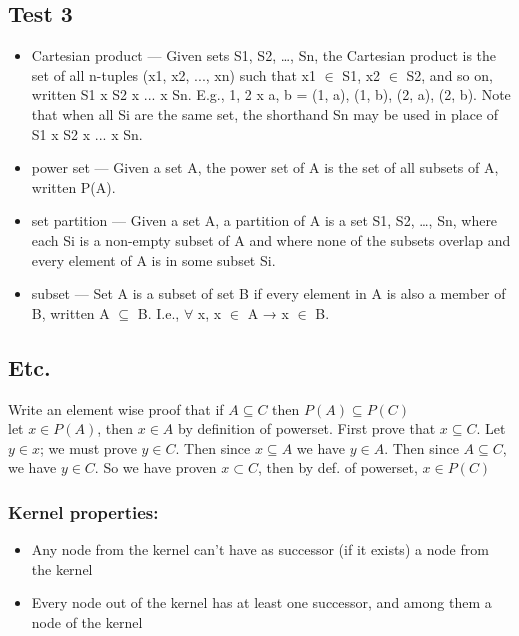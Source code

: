 \documentclass[8pt]{article}
\begin{document}
\begin{paracol}{3}
        \subsection*{Test 3}
        \begin{itemize}[noitemsep]
            \item Cartesian product — Given sets S1, S2, \ldots, Sn, the Cartesian product is the set of all n-tuples (x1, x2, ..., xn) such that x1 $\in$ S1, x2 $\in$ S2, and so on, written S1 x S2 x ... x Sn. E.g., {1, 2} x {a, b} = {(1, a), (1, b), (2, a), (2, b)}. Note that when all Si are the same set, the shorthand Sn may be used in place of S1 x S2 x ... x Sn.
            \item power set — Given a set A, the power set of A is the set of all subsets of A, written P(A).
            \item set partition — Given a set A, a partition of A is a set {S1, S2, \ldots, Sn}, where each Si is a non-empty subset of A and where none of the subsets overlap and every element of A is in some subset Si.
            \item subset — Set A is a subset of set B if every element in A is also a member of B, written A $\subseteq$ B. I.e., $\forall$ x, x $\in$ A → x $\in$ B.
        \end{itemize}
        \subsection*{Etc.}
        Write an element wise proof that if $A \subseteq C$ then $P(A) \subseteq P(C)$ \\
        let $x \in P(A)$, then $x \in A$ by definition of powerset.
        First prove that $ x \subseteq C$. Let $y \in x$; we must prove $y \in C$.
        Then since $x \subseteq A$ we have $y \in A$. Then since $A \subseteq C$, we have $y \in C$.
        So we have proven $x \subset C$, then by def. of powerset, $x \in P(C)$
        \\
        \subsubsection*{Kernel properties:}
        \begin{itemize}[noitemsep]
            \item Any node from the kernel can’t have as successor (if it exists) a node from the kernel
            \item Every node out of the kernel has at least one successor, and among them a node of the kernel
        \end{itemize}

\end{paracol}
\end{document}
